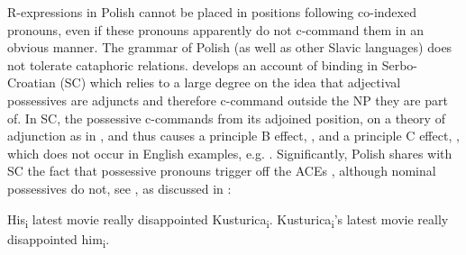 \documentclass[output=paper,modfonts,nonflat
]{langsci/langscibook}
\begin{document}
\noindent R-expressions in Polish cannot be placed in positions following co-indexed pronouns, even if these pronouns apparently do not c-command them in an obvious manner. The grammar of Polish (as well as other Slavic languages) does not tolerate cataphoric relations. \cite{despic2011,despic2013,despic2015} develops an account of binding in Serbo-Croatian (SC) which relies to a large degree on the idea that adjectival possessives are adjuncts and therefore c-command outside the NP they are part of. In SC, the possessive c-commands from its adjoined position, on a theory of adjunction as in \cite{kayne1994}, and thus causes a principle B effect, , and a principle C effect, , which does not occur in English examples, e.g. . Significantly, Polish shares with SC the fact that possessive pronouns trigger off the ACEs , although nominal possessives do not, see , as discussed in \cite{witkos2015}:

\ea\label{ex:witkos:17}
\ea His\textsubscript{i} latest movie really disappointed Kusturica\textsubscript{i}.
\ex Kusturica\textsubscript{i}’s latest movie really disappointed him\textsubscript{i}.
\z\z

\ea \label{ex:witkos:18}
\z
\z

\ea \label{ex:witkos:19}
	\z
\z
\end{document}
